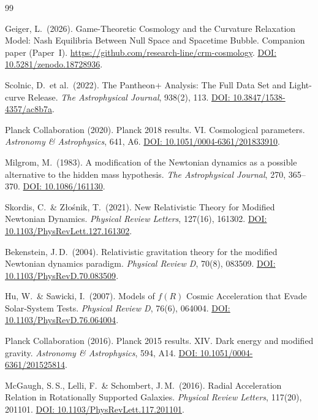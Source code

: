 \documentclass[aps,prd,twocolumn,superscriptaddress,nofootinbib,floatfix]{revtex4-2}
\begin{document}
\begin{thebibliography}{99}

Geiger, L.\ (2026).
Game-Theoretic Cosmology and the Curvature Relaxation Model: Nash Equilibria Between Null Space and Spacetime Bubble.
Companion paper (Paper~I). \url{https://github.com/research-line/crm-cosmology}.
\href{https://doi.org/10.5281/zenodo.18728936}{DOI: 10.5281/zenodo.18728936}.

Scolnic, D.\ et al.\ (2022).
The Pantheon+ Analysis: The Full Data Set and Light-curve Release.
\textit{The Astrophysical Journal}, 938(2), 113.
\href{https://doi.org/10.3847/1538-4357/ac8b7a}{DOI: 10.3847/1538-4357/ac8b7a}.

Planck Collaboration (2020).
Planck 2018 results. VI. Cosmological parameters.
\textit{Astronomy \& Astrophysics}, 641, A6.
\href{https://doi.org/10.1051/0004-6361/201833910}{DOI: 10.1051/0004-6361/201833910}.

Milgrom, M.\ (1983).
A modification of the Newtonian dynamics as a possible alternative to the hidden mass hypothesis.
\textit{The Astrophysical Journal}, 270, 365--370.
\href{https://doi.org/10.1086/161130}{DOI: 10.1086/161130}.

Skordis, C.\ \& Z{\l}o\'snik, T.\ (2021).
New Relativistic Theory for Modified Newtonian Dynamics.
\textit{Physical Review Letters}, 127(16), 161302.
\href{https://doi.org/10.1103/PhysRevLett.127.161302}{DOI: 10.1103/PhysRevLett.127.161302}.

Bekenstein, J.\,D.\ (2004).
Relativistic gravitation theory for the modified Newtonian dynamics paradigm.
\textit{Physical Review D}, 70(8), 083509.
\href{https://doi.org/10.1103/PhysRevD.70.083509}{DOI: 10.1103/PhysRevD.70.083509}.

Hu, W.\ \& Sawicki, I.\ (2007).
Models of $f(R)$ Cosmic Acceleration that Evade Solar-System Tests.
\textit{Physical Review D}, 76(6), 064004.
\href{https://doi.org/10.1103/PhysRevD.76.064004}{DOI: 10.1103/PhysRevD.76.064004}.

Planck Collaboration (2016).
Planck 2015 results. XIV. Dark energy and modified gravity.
\textit{Astronomy \& Astrophysics}, 594, A14.
\href{https://doi.org/10.1051/0004-6361/201525814}{DOI: 10.1051/0004-6361/201525814}.

McGaugh, S.\,S., Lelli, F.\ \& Schombert, J.\,M.\ (2016).
Radial Acceleration Relation in Rotationally Supported Galaxies.
\textit{Physical Review Letters}, 117(20), 201101.
\href{https://doi.org/10.1103/PhysRevLett.117.201101}{DOI: 10.1103/PhysRevLett.117.201101}.


\end{thebibliography}
\end{document}
